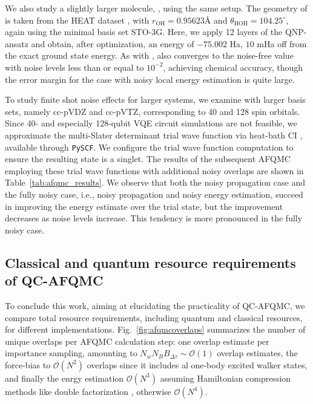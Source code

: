\documentclass[../main.tex]{subfiles}
\begin{document}
We also study a slightly larger molecule, , using the same setup. The geometry of  is taken from the HEAT dataset \cite{tajti2004heat}, with $r_\mathrm{OH} = 0.95623\text{\AA}$ and $\theta_\mathrm{HOH} = 104.25^\circ$, again using the minimal basis set STO-3G. Here, we apply 12 layers of the QNP-ansatz and obtain, after optimization, an energy of $-75.002$ Ha, $10$ mHa off from the exact ground state energy. As with ,  also converges to the noise-free value with noise levels less than or equal to $10^{-2}$, achieving chemical accuracy, though the error margin for the case with noisy local energy estimation is quite large.

To study finite shot noise effects for larger systems, we examine  with larger basis sets, namely cc-pVDZ and cc-pVTZ, corresponding to 40 and 128 spin orbitals. Since 40- and especially 128-qubit VQE circuit simulations are not feasible, we approximate the multi-Slater determinant trial wave function via heat-bath CI \cite{holmes2016heat}, available through \texttt{PySCF}. We configure the trial wave function computation to ensure the resulting state is a singlet. The results of the subsequent AFQMC employing these trial wave functions with additional noisy overlaps are shown in Table~\ref{tab:afqmc_results}. We observe that both the noisy propagation case and the fully noisy case, i.e., noisy propagation and noisy energy estimation, succeed in improving the energy estimate over the trial state, but the improvement decreases as noise levels increase. This tendency is more pronounced in the fully noisy case.

\subsection{Classical and quantum resource requirements of QC-AFQMC}

To conclude this work, aiming at elucidating the practicality of QC-AFQMC, we compare total resource requirements, including quantum and classical resources,  for different implementations. Fig.~\ref{fig:afqmcoverlaps} summarizes the number of unique overlaps per AFQMC calculation step: one overlap estimate per importance sampling, amounting to $N_w N_B B_{\Delta \tau} \sim \mathcal{O}(1)$ overlap estimates, the force-bias to $\mathcal{O}(N^2)$ overlaps since it includes al one-body excited walker states, and finally the enrgy estimation $\mathcal{O}(N^3)$  assuming Hamiltonian compression methods like double factorization \cite{lee2020even}, otherwise $\mathcal{O}(N^4)$.
\end{document}
